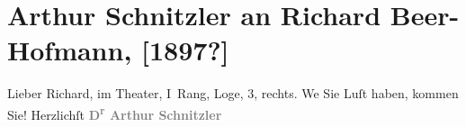 

         
         \renewcommand{\erwaehntePersonen}{Personen: Richard Beer-Hofmann}
         \renewcommand{\erwaehnteOrte}{Orte: Wien}
         \renewcommand{\erwaehnteWerke}{}
               \section[Arthur Schnitzler an Richard Beer-Hofmann, {[}1897?{]}]{ Arthur Schnitzler an Richard Beer-Hofmann, {[}1897?{]}}\nopagebreak{}\rehead{ }\begin{ledgroupsized}[t]{13cm}\normalsize\beginnumbering \toendnotes[C]{\smallbreak\pagebreak[2]} 
\toendnotes[C]{\smallbreak}\pstart
           \noindent{}{\pb}Lieber Richard, \label{K_L00634_1v}\label{K_L00634_1h} im Theater, I Rang, Loge, 3, rechts.\pend
           \pstart
           We{\geminationn} Sie Luſt haben, {\pb}kommen Sie!\pend
           \pstart
           \centering{}Herzlichſt\pend
           \pstart
           \noindent{}\centering{}\textcolor{gray}{\textbf{D\textsuperscript{r} Arthur Schnitzler}}\pend
           
         
         \endnumbering{}\end{ledgroupsized}  \newcommand{\dateiname}{L00634}\newcommand{\titel}{Arthur Schnitzler an Richard Beer-Hofmann, [1897?]}\newcommand{\editorInnen}{Martin Anton Müller und Gerd-Hermann Susen}
      